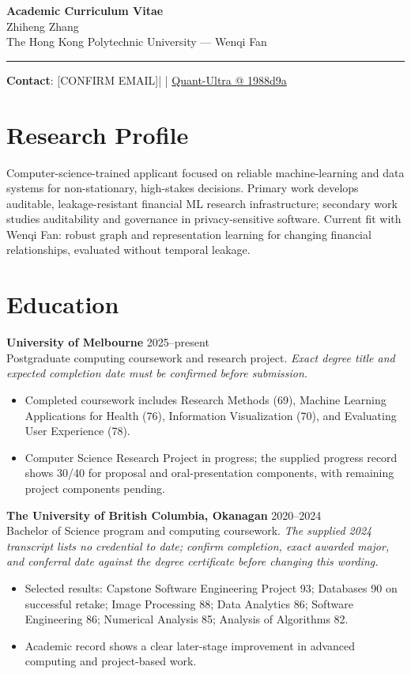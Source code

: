 \documentclass[11pt]{article}
\makeatletter
\newcommand{\ApplicantName}{Zhiheng Zhang}
\newcommand{\ApplicantEmail}{[CONFIRM EMAIL]}
\newcommand{\ApplicantPhone}{[CONFIRM PHONE]}
\newcommand{\ApplicantGitHub}{\href{https://github.com/zhiheng-zhang-Mera/Quant-Ultra/tree/1988d9a8530da91a8158de864d098ea869098923}{Quant-Ultra @ 1988d9a}}
\makeatother
\begin{document}
\begin{center}
{\LARGE\bfseries Academic Curriculum Vitae}\\[0.25em]
{\large \ApplicantName}\\
The Hong Kong Polytechnic University --- Wenqi Fan
\end{center}
\vspace{0.35em}\hrule\vspace{0.65em}

\textbf{Contact}: \ApplicantEmail\quad | \quad \ApplicantPhone\quad | \quad \ApplicantGitHub

\section*{Research Profile}
Computer-science-trained applicant focused on reliable machine-learning and data systems for non-stationary, high-stakes decisions. Primary work develops auditable, leakage-resistant financial ML research infrastructure; secondary work studies auditability and governance in privacy-sensitive software. Current fit with Wenqi Fan: robust graph and representation learning for changing financial relationships, evaluated without temporal leakage.

\section*{Education}
\textbf{University of Melbourne} \hfill 2025--present\\
Postgraduate computing coursework and research project. \textit{Exact degree title and expected completion date must be confirmed before submission.}
\begin{itemize}
\item Completed coursework includes Research Methods (69), Machine Learning Applications for Health (76), Information Visualization (70), and Evaluating User Experience (78).
\item Computer Science Research Project in progress; the supplied progress record shows 30/40 for proposal and oral-presentation components, with remaining project components pending.
\end{itemize}

\textbf{The University of British Columbia, Okanagan} \hfill 2020--2024\\
Bachelor of Science program and computing coursework. \textit{The supplied 2024 transcript lists no credential to date; confirm completion, exact awarded major, and conferral date against the degree certificate before changing this wording.}
\begin{itemize}
\item Selected results: Capstone Software Engineering Project 93; Databases 90 on successful retake; Image Processing 88; Data Analytics 86; Software Engineering 86; Numerical Analysis 85; Analysis of Algorithms 82.
\item Academic record shows a clear later-stage improvement in advanced computing and project-based work.
\end{itemize}
\end{document}
